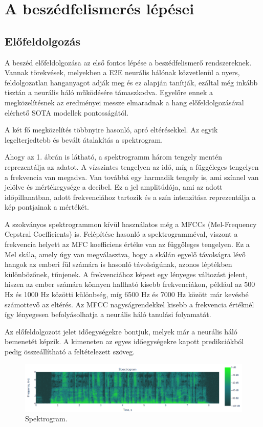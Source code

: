 \section{A beszédfelismerés lépései}

\subsection{Előfeldolgozás}

A beszéd előfeldolgozása az első fontos lépése a beszédfelismerő rendszereknek. Vannak törekvések, melyekben a E2E neurális hálónak közvetlenül a nyers, feldolgozatlan hanganyagot adják meg és ez alapján tanítják\cite{Zeghidour2018}, ezáltal még inkább tisztán a neurális háló működésére támaszkodva. Egyelőre ennek a megközelítésnek az eredményei messze elmaradnak a hang előfeldolgozásával elérhető SOTA modellek pontosságától.

A két fő megközelítés többnyire hasonló, apró eltérésekkel. Az egyik legelterjedtebb és bevált átalakítás a spektrogram.

Ahogy az 1. ábrán is látható, a spektrogramm három tengely mentén reprezentálja az adatot. A vízszintes tengelyen az idő, míg a függéleges tengelyen a frekvencia van megadva. Van továbbá egy harmadik tengely is, ami színnel van jelölve és mértékegysége a decibel. Ez a jel amplitúdója, ami az adott időpillanatban, adott frekvenciához tartozik és a szín intenzitása reprezentálja a kép pontjainak a mértékét.

A szokványos spektrogrammon kívül használatos még a MFCCs (Mel-Frequency Cepstral Coefficients) is. Felépítése hasonló a spektrogramméval, viszont a frekvencia helyett az MFC koefficiens \cite {mfcc} értéke van az függőleges tengelyen. Ez a Mel skála, amely úgy van megválasztva, hogy a skálán egyelő távolságra lévő hangok az emberi fül számára is hasonló távolságúnak, azonos léptékben különbözőnek, tűnjenek. A frekvenciához képest egy lényeges változást jelent, hiszen az ember számára könnyen hallható kisebb frekvenciákon, például az 500 Hz és 1000 Hz közötti különbség, míg 6500 Hz és 7000 Hz között már kevésbé számottevő az eltérés. Az MFCC nagyságrendekkel kisebb a frekvencia értéknél így lényegesen befolyásolhatja a neurális háló tanulási folyamatát.

Az előfeldolgozott jelet időegységekre bontjuk, melyek már a neurális háló bemenetét képzik. A kimeneten az egyes időegységekre kapott predikciókból pedig összeállítható a feltételezett szöveg.

\begin{figure}[!ht]
\centering
\includegraphics[width=150mm, keepaspectratio]{figures/spectogram.png}
\caption{Spektrogram.}
\end{figure}

